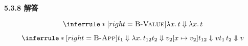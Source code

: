 \begin{taplauthorsolutionentrybox}
\label{sol:author:5.3.8}
\textbf{5.3.8 解答}

\[
\inferrule*[right=\textsc{B-Value}]
  { }
  {\lambda x.\,t\bigstep\lambda x.\,t}
\]
\[
\inferrule*[right=\textsc{B-App}]
  {t_1\bigstep\lambda x.\,t_{12}\\
   t_2\bigstep v_2\\
   \taplsubst{x}{v_2}{t_{12}}\bigstep v}
  {t_1\,t_2\bigstep v}
\]

\end{taplauthorsolutionentrybox}
